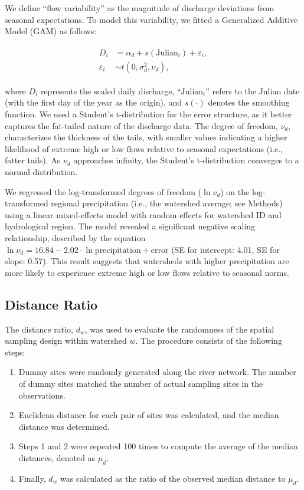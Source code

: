 \documentclass[11pt, class=article, crop=false]{standalone}
\theoremstyle{definition}
\begin{document}
We define ``flow variability'' as the magnitude of discharge deviations from seasonal expectations.
To model this variability, we fitted a Generalized Additive Model (GAM) as follows:

\begin{align}
    \begin{split}
    D_i &= \alpha_d + s(\mbox{Julian}_i) + \varepsilon_i,\\
    \varepsilon_i &\sim t(0, \sigma_d^2, \nu_d),
    \end{split}
\end{align}

where $D_i$ represents the scaled daily discharge, ``$\mbox{Julian}_i$'' refers to the Julian date (with the first day of the year as the origin), and $s(\cdot)$ denotes the smoothing function.
We used a Student's t-distribution for the error structure, as it better captures the fat-tailed nature of the discharge data.
The degree of freedom, $\nu_d$, characterizes the thickness of the tails, with smaller values indicating a higher likelihood of extreme high or low flows relative to seasonal expectations (i.e., fatter tails).
As $\nu_d$ approaches infinity, the Student's t-distribution converges to a normal distribution.

We regressed the log-transformed degrees of freedom ($\ln \nu_d$) on the log-transformed regional precipitation (i.e., the watershed average; see Methods) using a linear mixed-effects model with random effects for watershed ID and hydrological region.
The model revealed a significant negative scaling relationship, described by the equation $\ln \nu_d = 16.84 - 2.02 \cdot \ln \text{precipitation} + \text{error}$ (SE for intercept: 4.01, SE for slope: 0.57).
This result suggests that watersheds with higher precipitation are more likely to experience extreme high or low flows relative to seasonal norms.

\subsection{Distance Ratio}

The distance ratio, $d_{w}$, was used to evaluate the randomness of the spatial sampling design within watershed $w$.
The procedure consists of the following steps:

\begin{enumerate}
    \item Dummy sites were randomly generated along the river network. The number of dummy sites matched the number of actual sampling sites in the observations.
    \item Euclidean distance for each pair of sites was calculated, and the median distance was determined.
    \item Steps 1 and 2 were repeated 100 times to compute the average of the median distances, denoted as $\mu_d$.
    \item Finally, $d_{w}$ was calculated as the ratio of the observed median distance to $\mu_d$.
\end{enumerate}
\end{document}
